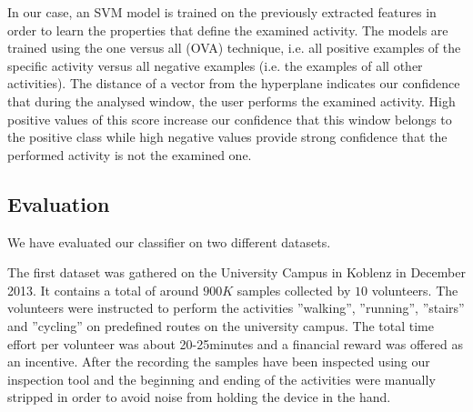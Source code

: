 In our case, an SVM model is trained on the previously extracted
features in order to learn the properties that define the examined
activity. The models are trained using the one versus all (OVA)
technique, i.e. all positive examples of the specific activity versus
all negative examples (i.e. the examples of all other activities). The
distance of a vector from the hyperplane indicates our confidence that
during the analysed window, the user performs the examined
activity. High positive values of this score increase our confidence
that this window belongs to the positive class while high negative
values provide strong confidence that the performed activity is not
the examined one.



\subsection{Evaluation}\label{sec:har_eval}

We have evaluated our classifier on two different datasets.

The first dataset was gathered on the University Campus in Koblenz in
December 2013.  It contains a total of around $900K$ samples collected
by $10$ volunteers.  The volunteers were instructed to perform the
activities ''walking'', ''running'', ''stairs'' and ''cycling'' on
predefined routes on the university campus. 
The total time effort per volunteer was about 20-25minutes and a financial reward was offered as
an incentive. After the recording the samples have been inspected
using our inspection tool and the beginning and ending of the
activities were manually stripped in order to avoid noise from holding
the device in the hand.


